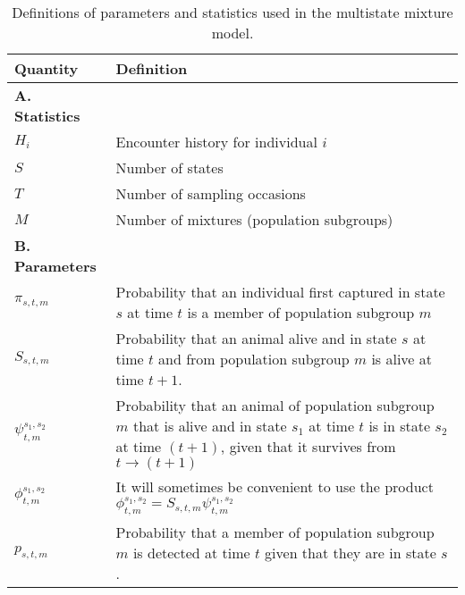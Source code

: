\documentclass[times,mee,doublespace,]{besauth2}
\begin{document}




\pagebreak
\begin{table}[ht]
\caption{Definitions of parameters and statistics used in the multistate mixture model.
}
\label{tab:notation}
\raggedright
\begin{tabular}{p{2cm}p{13cm}}
  \hline
   Quantity & Definition \\
  \hline
   \textbf{A. Statistics}  &   \\ 
  $H_i$ & Encounter history for individual $i$ \\
  $S$ & Number of states \\
  $T$ & Number of sampling occasions \\
  $M$ & Number of mixtures (population subgroups) \\
  \textbf{B. Parameters } & \\
  $\pi_{s,t,m}$ & Probability that an individual first captured in state $s$ at time $t$ is a member of population subgroup $m$ \\
  $S_{s,t,m}$ & Probability that an animal alive and in state $s$ at time $t$ and from population subgroup $m$ is alive at time $t+1$. \\
  $\psi_{t,m}^{s_1,s_2}$ & Probability that an animal of population subgroup $m$ that is alive and in state $s_1$ at time $t$ is in state $s_2$ at time $(t+1)$, given that it survives from $t \rightarrow (t+1)$ \\
  $\phi_{t,m}^{s_1,s_2}$ & It will sometimes be convenient to use the product $\phi_{t,m}^{s_1,s_2} = S_{s,t,m} \psi_{t,m}^{s_1,s_2}$ \\
  $p_{s,t,m}$ & Probability that a member of population subgroup $m$ is detected at time $t$ given that they are in state $s$.  \\
\hline
\end{tabular}
\\
\end{table}
\end{document}
